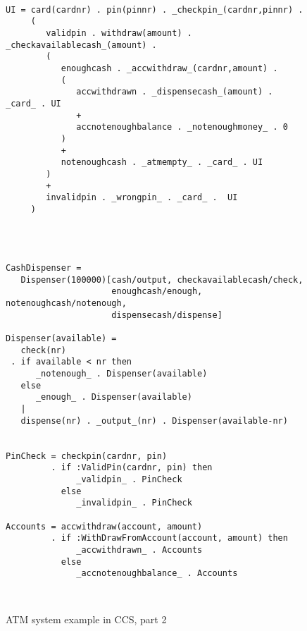 \begin{figure}[t!]
\label{fig:atm_system2}
\caption{ATM system example in CCS, part 2}
\lstset{showtabs=false,showspaces=false,showstringspaces=false}
\begin{lstlisting}[frame=trbl,language=klaim,basicstyle=\footnotesize\ttfamily,showtabs=false,showspaces=false]

UI = card(cardnr) . pin(pinnr) . _checkpin_(cardnr,pinnr) .
     (
        validpin . withdraw(amount) . _checkavailablecash_(amount) .
        (
           enoughcash . _accwithdraw_(cardnr,amount) .
           (
              accwithdrawn . _dispensecash_(amount) . _card_ . UI
              + 
              accnotenoughbalance . _notenoughmoney_ . 0
           )
           +
           notenoughcash . _atmempty_ . _card_ . UI
        )
        +
        invalidpin . _wrongpin_ . _card_ .  UI  
     )




CashDispenser = 
   Dispenser(100000)[cash/output, checkavailablecash/check, 
                     enoughcash/enough, notenoughcash/notenough,
                     dispensecash/dispense]

Dispenser(available) = 
   check(nr) 
 . if available < nr then 
      _notenough_ . Dispenser(available) 
   else 
      _enough_ . Dispenser(available)
   |
   dispense(nr) . _output_(nr) . Dispenser(available-nr)
                         

PinCheck = checkpin(cardnr, pin)  
         . if :ValidPin(cardnr, pin) then
              _validpin_ . PinCheck
           else
              _invalidpin_ . PinCheck
              
Accounts = accwithdraw(account, amount) 
         . if :WithDrawFromAccount(account, amount) then
              _accwithdrawn_ . Accounts
           else
              _accnotenoughbalance_ . Accounts
              
              
\end{lstlisting}
\end{figure}	

